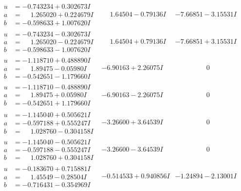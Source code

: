 \documentclass[1p]{elsarticle_modified}
\theoremstyle{definition}
\begin{document}
$$\begin{array}{c|c|c}
\begin{aligned}
u &= -0.743234 + 0.302673 I \\
a &= \phantom{-}1.265020 + 0.224679 I \\
b &= -0.598633 + 1.007620 I\end{aligned}
 & \phantom{-}1.64504 - 0.79136 I & -7.66851 - 3.15531 I \\ \hline\begin{aligned}
u &= -0.743234 - 0.302673 I \\
a &= \phantom{-}1.265020 - 0.224679 I \\
b &= -0.598633 - 1.007620 I\end{aligned}
 & \phantom{-}1.64504 + 0.79136 I & -7.66851 + 3.15531 I \\ \hline\begin{aligned}
u &= -1.118710 + 0.488890 I \\
a &= \phantom{-}1.89475 - 0.05980 I \\
b &= -0.542651 - 1.179660 I\end{aligned}
 & -6.90163 + 2.26075 I & \phantom{-0.000000 } 0 \\ \hline\begin{aligned}
u &= -1.118710 - 0.488890 I \\
a &= \phantom{-}1.89475 + 0.05980 I \\
b &= -0.542651 + 1.179660 I\end{aligned}
 & -6.90163 - 2.26075 I & \phantom{-0.000000 } 0 \\ \hline\begin{aligned}
u &= -1.145040 + 0.505621 I \\
a &= -0.597188 + 0.555247 I \\
b &= \phantom{-}1.028760 - 0.304158 I\end{aligned}
 & -3.26600 + 3.64539 I & \phantom{-0.000000 } 0 \\ \hline\begin{aligned}
u &= -1.145040 - 0.505621 I \\
a &= -0.597188 - 0.555247 I \\
b &= \phantom{-}1.028760 + 0.304158 I\end{aligned}
 & -3.26600 - 3.64539 I & \phantom{-0.000000 } 0 \\ \hline\begin{aligned}
u &= -0.183670 + 0.715881 I \\
a &= \phantom{-}1.45549 - 0.28504 I \\
b &= -0.716431 - 0.354969 I\end{aligned}
 & -0.514533 + 0.940856 I & -1.24894 - 2.13001 I\\

\end{array}$$
\end{document}
